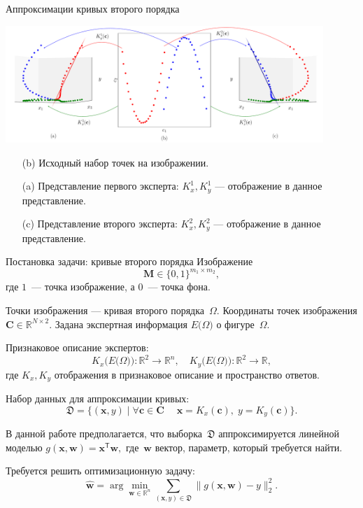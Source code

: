 \documentclass[10pt,pdf,hyperref={unicode}]{beamer}
\begin{document}

\begin{frame}{Аппроксимации кривых второго порядка}
\justifying
\begin{center}
	\includegraphics[width=0.9\textwidth]{figures/explanation}
\end{center}

\begin{enumerate}
    \item[(b)] Исходный набор точек на изображении.
    \item[(a)] Представление первого эксперта: $K^{1}_x, K^{1}_y$ --- отображение в данное представление.
    \item[(c)] Представление второго эксперта: $K^{2}_x, K^{2}_y$ --- отображение в данное представление.
\end{enumerate}

\end{frame}


\begin{frame}{Постановка задачи: кривые второго порядка}
\justifying
Изображение
\[
\mathbf{M} \in \{0,1\}^{m_1\times m_2},
\]
где $1$~--- точка изображение,  а $0$~--- точка фона. 

Точки изображения --- кривая второго порядка~$\Omega$.
Координаты точек изображения $\mathbf{C} \in \mathbb{R}^{N\times2}$.
Задана экспертная информация $E\bigr(\Omega\bigr)$ о фигуре~$\Omega$.

Признаковое описание экспертов:
\[
K_x\bigr(E\bigr(\Omega\bigr)\bigr):\mathbb{R}^{2} \to \mathbb{R}^{n},
\quad K_y\bigr(E\bigr(\Omega\bigr)\bigr): \mathbb{R}^{2} \to \mathbb{R},
\]
где $K_x, K_y$ отображения в признаковое описание и пространство ответов.

Набор данных для аппроксимации кривых:
\[
\mathfrak{D} = \{(\mathbf{x}, y) \; | \; \forall \mathbf{c} \in \mathbf{C} \;\quad \mathbf{x} = K_x(\mathbf{c}), \; y = K_y(\mathbf{c}) \}.
\]

В данной работе предполагается, что выборка~$\mathfrak{D}$ аппроксимируется линейной моделью
$
	g(\mathbf{x}, \mathbf{w}) = \mathbf{x}^\mathsf{T} \mathbf{w},
$
где~$\mathbf{w}$ вектор, параметр, который требуется найти.


Требуется решить оптимизационную задачу:
\[
	\hat{\mathbf{w}} = \arg\min_{\mathbf{w}\in\mathbb{R}^n} \sum_{\left(\mathbf{x}, y\right) \in \mathfrak{D}}\|g(\mathbf{x}, \mathbf{w}) - y \|_2^2.
\]
\end{frame}
\end{document}
